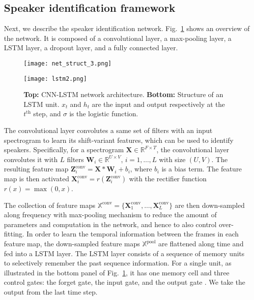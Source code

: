 \documentclass[a4paper]{article}
\begin{document}
\subsection{Speaker identification framework}
Next, we describe the speaker identification network. Fig.~\ref{fig:net} shows an overview of the network. It is composed of a convolutional layer, a max-pooling layer, a LSTM layer, a dropout layer, and a fully connected layer.

\begin{figure}[!ht]
\centering
\begin{minipage}[b]{0.8\linewidth}
\texttt{[image: net\_struct\_3.png]} %
\end{minipage}\hfill
\centering
\begin{minipage}[b]{0.5\linewidth}
\texttt{[image: lstm2.png]} %
\end{minipage}\hfill
\caption{\textbf{Top:} CNN-LSTM network architecture. \textbf{Bottom:} Structure of an LSTM unit. $x_t$ and $h_t$ are the input and output respectively at the $t^{\mathrm{th}}$ step, and $\sigma$ is the logistic function.}
\label{fig:net}
\end{figure}

The convolutional layer convolutes a same set of filters with an input spectrogram to learn its shift-variant features, which can be used to identify speakers. Specifically, for a spectrogram $\mathbf{X} \in \mathbb{R}^{F \times T}$, the convolutional layer convolutes it with $L$ filters $\mathbf{W}_i \in \mathbb{R}^{U \times V}$, $i=1, \ldots, L$ with size $(U, V)$. The resulting feature map $\mathbf{Z}_i^{\mathrm{conv}} = \mathbf{X} \ast \mathbf{W}_i + b_i$, where $b_{i}$ is a bias term. The feature map is then activated $\mathbf{X}_i^{\mathrm{conv}} = r(\mathbf{Z}_i^{\mathrm{conv}})$ with the rectifier function $r(x) = \max(0, x)$.

The collection of feature maps $\mathbb{X}^{\mathrm{conv}} = \{\mathbf{X}_1^{\mathrm{conv}}, \ldots, \mathbf{X}_L^{\mathrm{conv}}\}$ are then down-sampled along frequency with max-pooling mechanism \cite{zeiler2014visualizing} to reduce the amount of parameters and computation in the network, and hence to also control over-fitting. In order to learn the temporal information between the frames in each feature map, the down-sampled feature maps $\mathbb{X}^{\mathrm{pool}}$ are flattened along time and fed into a LSTM layer. The LSTM layer consists of a sequence of memory units to selectively remember the past sequence information. For a single unit, as illustrated in the bottom panel of Fig.~\ref{fig:net}\cite{Olah2015lstm}, it has one memory cell and three control gates: the forget gate, the input gate, and the output gate \cite{hochreiter1997long}. We take the output from the last time step.
\end{document}
